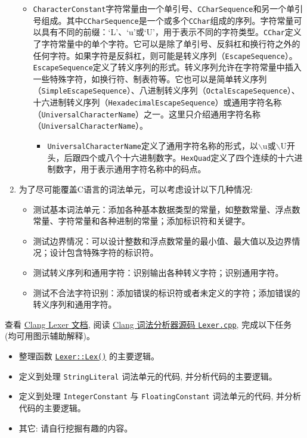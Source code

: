 \documentclass[a4paper, justified]{tufte-handout}
\begin{document}
\begin{solution}
\begin{enumerate}[(1)]
\begin{itemize}
        \item \texttt{CharacterConstant}字符常量由一个单引号、\texttt{CCharSequence}和另一个单引号组成。其中\texttt{CCharSequence}是一个或多个\texttt{CChar}组成的序列。字符常量可以具有不同的前缀：`L'、`u'或`U'，用于表示不同的字符类型。\texttt{CChar}定义了字符常量中的单个字符。它可以是除了单引号、反斜杠和换行符之外的任何字符。如果字符是反斜杠，则可能是转义序列（\texttt{EscapeSequence}）。\texttt{EscapeSequence}定义了转义序列的形式。转义序列允许在字符常量中插入一些特殊字符，如换行符、制表符等。它也可以是简单转义序列（\texttt{SimpleEscapeSequence}）、八进制转义序列（\texttt{OctalEscapeSequence}）、十六进制转义序列（\texttt{HexadecimalEscapeSequence}）或通用字符名称（\texttt{UniversalCharacterName}）之一。这里只介绍通用字符名称（\texttt{UniversalCharacterName}）。
          \begin{itemize}
            \item \texttt{UniversalCharacterName}定义了通用字符名称的形式，以$\backslash$u或$\backslash$U开头，后跟四个或八个十六进制数字。\texttt{HexQuad}定义了四个连续的十六进制数字，用于表示通用字符名称中的码点。
          \end{itemize}
      \end{itemize}
    \item 为了尽可能覆盖C语言的词法单元，可以考虑设计以下几种情况:
      \begin{itemize}
        \item 测试基本词法单元：添加各种基本数据类型的常量，如整数常量、浮点数常量、字符常量和各种进制的常量；添加标识符和关键字。
        \item 测试边界情况：可以设计整数和浮点数常量的最小值、最大值以及边界情况；设计包含特殊字符的标识符。
        \item 测试转义序列和通用字符：识别输出各种转义字符；识别通用字符。
        \item 测试不合法字符识别：添加错误的标识符或者未定义的字符；添加错误的转义序列和通用字符。
      \end{itemize}
  \end{enumerate}
\end{solution}

\begin{problem}[词法分析器代码分析]
  查看 \href{https://clang.llvm.org/doxygen/classclang_1_1Lexer.html}{Clang Lexer 文档},
  阅读 \href{https://clang.llvm.org/doxygen/Lexer_8cpp_source.html}{Clang 词法分析器源码 \texttt{Lexer.cpp}},
  完成以下任务 (均可用图示辅助解释)。
  \begin{itemize}
    \item 整理函数 \href{https://clang.llvm.org/doxygen/Lexer_8cpp_source.html\#l03669}{\texttt{Lexer::Lex()}}
      的主要逻辑。
    \item 定义到处理 \texttt{StringLiteral} 词法单元的代码,
      并分析代码的主要逻辑。
    \item 定义到处理 \texttt{IntegerConstant} 与 \texttt{FloatingConstant} 词法单元的代码,
      并分析代码的主要逻辑。
    \item 其它: 请自行挖掘有趣的内容。
  \end{itemize}
\end{problem}
\end{document}
